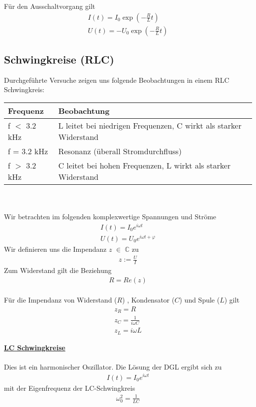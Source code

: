 \documentclass[a4paper,12pt]{report}
\begin{document}
Für den Ausschaltvorgang gilt
\begin{align}
I(t) = I_0\exp(-\frac{R}{L} t) \\
U(t) = - U_0\exp(-\frac{R}{L} t)
\end{align}

\subsection{Schwingkreise (RLC)}

Durchgeführte Versuche zeigen uns folgende Beobachtungen in einem RLC Schwingkreis: \\

\begin{tabular}[h]{l|l}
Frequenz & Beobachtung \\
\hline
f $<$ 3.2 kHz & L leitet bei niedrigen Frequenzen, C wirkt als starker Widerstand \\
\hline
f = 3.2 kHz & Resonanz (überall Stromdurchfluss)\\
\hline
f $>$ 3.2 kHz & C leitet bei hohen Frequenzen, L wirkt als starker Widerstand 
\end{tabular} \\\\
Wir betrachten im folgenden komplexwertige Spannungen und Ströme 
\begin{align}
I(t) = I_0e^{i\omega t} \\
U(t) = U_0e^{i\omega t + \varphi}
\end{align}
Wir definieren uns die Impendanz $z$ $\in$ $\mathbb{C}$ zu
\begin{align}
z := \frac{U}{I}
\end{align}
Zum Widerstand gilt die Beziehung 
\begin{align}
R = Re(z)
\end{align} \\
Für die Impendanz von Widerstand ($R$) , Kondensator ($C$) und Spule ($L$) gilt
\begin{align}
z_R = R \\
z_C = \frac{1}{i\omega C} \\
z_L = i \omega L
\end{align}

\underline{\textbf{LC Schwingkreise}} \\\\
Dies ist ein harmonischer Oszillator.
Die Lösung der DGL ergibt sich zu 
\begin{align}
I(t) = I_0e^{i\omega t}
\end{align}
mit der Eigenfrequenz der LC-Schwingkreis
\begin{align}
\omega_0^2 = \frac{1}{LC}
\end{align}
\end{document}
